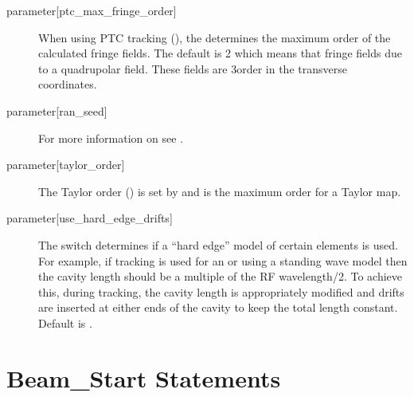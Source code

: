 \begin{description}
  \item[{parameter[ptc_max_fringe_order]}] \Newline
When using PTC tracking (), the
 determines the maximum order of
the calculated fringe fields. The default is 2 which means that fringe
fields due to a quadrupolar field. These fields are 3\Rd order in the
transverse coordinates.

  \item[{parameter[ran_seed]}] \Newline
For more information on  see .

  \item[{parameter[taylor_order]}] \Newline
The Taylor order () is set by
 and is the maximum order for a Taylor map.

  \item[{parameter[use_hard_edge_drifts]}] \Newline
The  switch determines if a ``hard edge''
model of certain elements is used. For example, if 
tracking is used for an  or  using a standing
wave model then the cavity length should be a multiple of the RF
wavelength/2. To achieve this, during tracking, the cavity length is
appropriately modified and drifts are inserted at either ends of the
cavity to keep the total length constant. Default is .

  \end{description}

\section{Beam_Start Statements} 
\label{s:beam.start}

